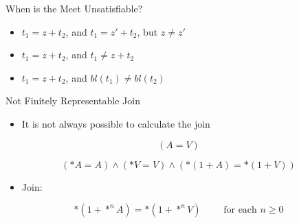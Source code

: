 \documentclass[aspectratio=169]{beamer}
\begin{document}
\begin{frame}{When is the Meet Unsatisfiable?}
    \begin{itemize}

        \item $t_1 = z + t_2$, and $t_1 = z' + t_2$, but $z\neq z'$

        \item $t_1 = z + t_2$, and $t_1 \neq z + t_2$

        \item $t_1 = z + t_2$, and $bl(t_1) \neq bl(t_2)$


    \end{itemize}
\end{frame}


\begin{frame}{Not Finitely Representable Join}
    \begin{itemize}
        \item It is not always possible to calculate the join
    \end{itemize}

    \[
        (A = V)
    \]

    \[
        (*A = A)\land (*V=V) \land (*(1 + A) = *(1 + V))
    \]
    \begin{itemize}
        \item Join:
    \end{itemize}
    \[
        *(1+*^n A) = *(1 + *^n V)\quad\quad\text{ for each $n \geq 0$}
    \]
\end{frame}

\end{document}
